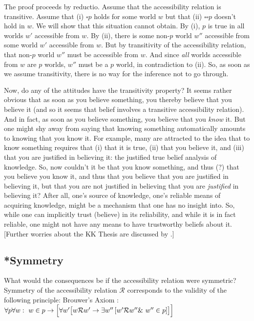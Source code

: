The proof proceeds by reductio. Assume that the accessibility relation is
transitive. Assume that (i) $\square p$ holds for some world $w$ but that (ii)
$\square \square p$ doesn't hold in $w$. We will show that this situation cannot
obtain. By (i), $p$ is true in all worlds $w'$ accessible from $w$. By (ii),
there is some non-$p$ world $w''$ accessible from some world $w'$ accessible
from $w$. But by transitivity of the accessibility relation, that non-$p$ world
$w''$ must be accessible from $w$. And since \emph{all} worlds accessible from
$w$ are $p$ worlds, $w''$ must be a $p$ world, in contradiction to (ii). So, as
soon as we assume transitivity, there is no way for the inference not to go
through.

Now, do any of the attitudes have the transitivity property? It seems rather
obvious that as soon as you believe something, you thereby believe that you
believe it (and so it seems that belief involves a transitive accessibility
relation). And in fact, as soon as you believe something, you believe that you
\emph{know} it. But one might shy away from saying that knowing something
automatically amounts to knowing that you know it. For example, many are
attracted to the idea that to know something requires that (i) that it is true,
(ii) that you believe it, and (iii) that you are justified in believing it: the
justified true belief analysis of knowledge. So, now couldn't it be that you
know something, and thus (?) that you believe you know it, and thus that you
believe that you are justified in believing it, but that you are not justified
in believing that you are \emph{justified} in believing it? After all, one's
source of knowledge, one's reliable means of acquiring knowledge, might be a
mechanism that one has no insight into. So, while one can implicitly trust
(believe) in its reliability, and while it is in fact reliable, one might not
have any means to have trustworthy beliefs about it. [Further worries about the
KK Thesis are discussed by \citet{williamson:2000:limits}.]

\subsection{*Symmetry}

What would the consequences be if the accessibility relation were symmetric?
Symmetry of the accessibility relation $\mathcal{R}$ corresponds to the validity
of the following principle:
%
%
\ex Brouwer's Axiom :\\
$\forall p \forall w:\ w\in p \rightarrow \Bigl[\forall w' \bigl[ w\mathcal{R}w'
\rightarrow \exists w'' \left[ w'\mathcal{R}w'' \&\ w''\in p\right]\bigr]\Bigr]$ \xe
%

